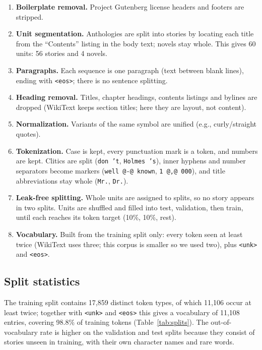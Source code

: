 \documentclass[11pt]{article}
\begin{document}
\begin{enumerate}
    \item \textbf{Boilerplate removal.} Project Gutenberg license headers
    and footers are stripped.

    \item \textbf{Unit segmentation.} Anthologies are split into stories
    by locating each title from the ``Contents'' listing in the body text;
    novels stay whole. This gives 60 units: 56 stories and 4 novels.

    \item \textbf{Paragraphs.} Each sequence is one paragraph (text
    between blank lines), ending with \texttt{<eos>}; there is no sentence
    splitting.

    \item \textbf{Heading removal.} Titles, chapter headings, contents
    listings and bylines are dropped (WikiText keeps section titles; here
    they are layout, not content).

    \item \textbf{Normalization.} Variants of the same symbol are unified
    (e.g., curly/straight quotes).

    \item \textbf{Tokenization.} Case is kept, every punctuation mark is a
    token, and numbers are kept. Clitics are split (\texttt{don 't},
    \texttt{Holmes 's}), inner hyphens and number separators become markers
    (\texttt{well @-@ known}, \texttt{1 @,@ 000}), and title abbreviations
    stay whole (\texttt{Mr.}, \texttt{Dr.}).

    \item \textbf{Leak-free splitting.} Whole units are assigned to splits,
    so no story appears in two splits. Units are shuffled and
    filled into test, validation, then train, until each reaches its token
    target (10\%, 10\%, rest).

    \item \textbf{Vocabulary.} Built from the training split only: every
    token seen at least twice (WikiText uses three; this corpus is smaller so we used two), plus \texttt{<unk>} and
    \texttt{<eos>}.
\end{enumerate}

\subsection{Split statistics}

The training split contains 17{,}859 distinct token types, of which
11{,}106 occur at least twice; together with \texttt{<unk>} and
\texttt{<eos>} this gives a vocabulary of 11{,}108 entries, covering
98.8\% of training tokens (Table~\ref{tab:splits}). The out-of-vocabulary
rate is higher on the validation and test splits because they consist of
stories unseen in training, with their own character names and rare words.
\end{document}
